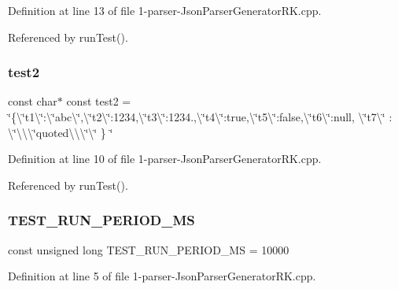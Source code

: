 Definition at line 13 of file 1-\/parser-\/\+Json\+Parser\+Generator\+R\+K.\+cpp.



Referenced by run\+Test().

\mbox{\label{1-parser-_json_parser_generator_r_k_8cpp_a27c66a6ddd571e937494116d9918691b}} 
\subsubsection{test2}
{\footnotesize\ttfamily const char$\ast$ const test2 = \char`\"{}\{\textbackslash{}\char`\"{}t1\textbackslash{}\char`\"{}\+:\textbackslash{}\char`\"{}abc\textbackslash{}\char`\"{},\textbackslash{}\char`\"{}t2\textbackslash{}\char`\"{}\+:1234,\textbackslash{}\char`\"{}t3\textbackslash{}\char`\"{}\+:1234.,\textbackslash{}\char`\"{}t4\textbackslash{}\char`\"{}\+:true,\textbackslash{}\char`\"{}t5\textbackslash{}\char`\"{}\+:false,\textbackslash{}\char`\"{}t6\textbackslash{}\char`\"{}\+:null, \textbackslash{}\char`\"{}t7\textbackslash{}\char`\"{} \+: \textbackslash{}\char`\"{}\textbackslash{}\textbackslash{}\textbackslash{}\char`\"{}quoted\textbackslash{}\textbackslash{}\textbackslash{}\char`\"{}\textbackslash{}\char`\"{} \} \char`\"{}}



Definition at line 10 of file 1-\/parser-\/\+Json\+Parser\+Generator\+R\+K.\+cpp.



Referenced by run\+Test().

\mbox{\label{1-parser-_json_parser_generator_r_k_8cpp_a0aa12824a9c1a44e8d9f2499e0ba2698}} 
\subsubsection{T\+E\+S\+T\+\_\+\+R\+U\+N\+\_\+\+P\+E\+R\+I\+O\+D\+\_\+\+MS}
{\footnotesize\ttfamily const unsigned long T\+E\+S\+T\+\_\+\+R\+U\+N\+\_\+\+P\+E\+R\+I\+O\+D\+\_\+\+MS = 10000}



Definition at line 5 of file 1-\/parser-\/\+Json\+Parser\+Generator\+R\+K.\+cpp.

